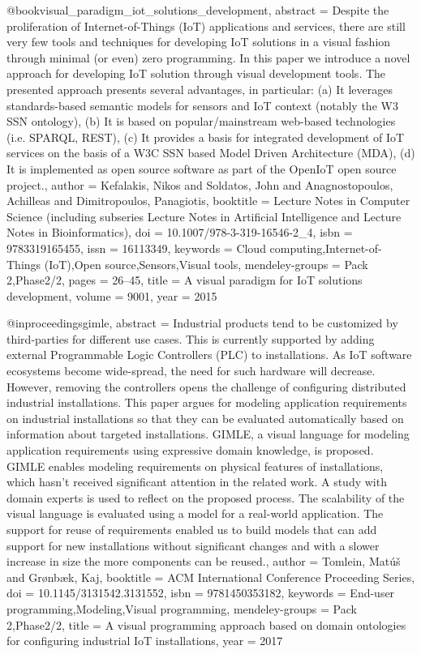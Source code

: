 @book{visual_paradigm_iot_solutions_development,
    abstract = {Despite the proliferation of Internet-of-Things (IoT) applications and services, there are still very few tools and techniques for developing IoT solutions in a visual fashion through minimal (or even) zero programming. In this paper we introduce a novel approach for developing IoT solution through visual development tools. The presented approach presents several advantages, in particular: (a) It leverages standards-based semantic models for sensors and IoT context (notably the W3 SSN ontology), (b) It is based on popular/mainstream web-based technologies (i.e. SPARQL, REST), (c) It provides a basis for integrated development of IoT services on the basis of a W3C SSN based Model Driven Architecture (MDA), (d) It is implemented as open source software as part of the OpenIoT open source project.},
    author = {Kefalakis, Nikos and Soldatos, John and Anagnostopoulos, Achilleas and Dimitropoulos, Panagiotis},
    booktitle = {Lecture Notes in Computer Science (including subseries Lecture Notes in Artificial Intelligence and Lecture Notes in Bioinformatics)},
    doi = {10.1007/978-3-319-16546-2_4},
    isbn = {9783319165455},
    issn = {16113349},
    keywords = {Cloud computing,Internet-of-Things (IoT),Open source,Sensors,Visual tools},
    mendeley-groups = {Pack 2,Phase2/2},
    pages = {26--45},
    title = {{A visual paradigm for IoT solutions development}},
    volume = {9001},
    year = {2015}
}

@inproceedings{gimle,
    abstract = {Industrial products tend to be customized by third-parties for different use cases. This is currently supported by adding external Programmable Logic Controllers (PLC) to installations. As IoT software ecosystems become wide-spread, the need for such hardware will decrease. However, removing the controllers opens the challenge of configuring distributed industrial installations. This paper argues for modeling application requirements on industrial installations so that they can be evaluated automatically based on information about targeted installations. GIMLE, a visual language for modeling application requirements using expressive domain knowledge, is proposed. GIMLE enables modeling requirements on physical features of installations, which hasn't received significant attention in the related work. A study with domain experts is used to reflect on the proposed process. The scalability of the visual language is evaluated using a model for a real-world application. The support for reuse of requirements enabled us to build models that can add support for new installations without significant changes and with a slower increase in size the more components can be reused.},
    author = {Tomlein, Mat{\'{u}}{\v{s}} and Gr{\o}nb{\ae}k, Kaj},
    booktitle = {ACM International Conference Proceeding Series},
    doi = {10.1145/3131542.3131552},
    isbn = {9781450353182},
    keywords = {End-user programming,Modeling,Visual programming},
    mendeley-groups = {Pack 2,Phase2/2},
    title = {{A visual programming approach based on domain ontologies for configuring industrial IoT installations}},
    year = {2017}
}

